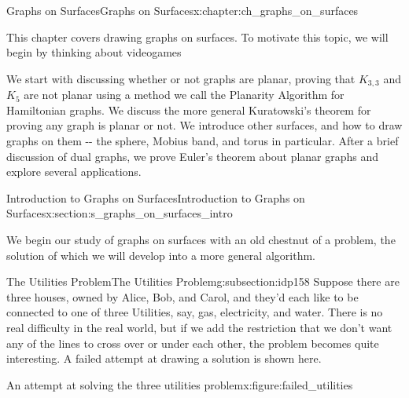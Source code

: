 \documentclass[oneside,10pt,]{book}
\numberwithin{equation}{section}
\begin{document}
\begin{chapterptx}{Graphs on Surfaces}{}{Graphs on Surfaces}{}{}{x:chapter:ch_graphs_on_surfaces}
\begin{introduction}{}%
This chapter covers drawing graphs on surfaces. To motivate this topic, we will begin by thinking about videogames%
\par
We start with discussing whether or not graphs are planar, proving that \(K_{3,3}\) and \(K_5\) are not planar using a method we call the Planarity Algorithm for Hamiltonian graphs.  We discuss the more general Kuratowski's theorem for proving any graph is planar or not.  We introduce other surfaces, and how to draw graphs on them -{}-{} the sphere, Mobius band, and torus in particular.  After a brief discussion of dual graphs, we prove Euler's theorem about planar graphs and explore several applications.%
\end{introduction}%
%
%
\typeout{************************************************}
\typeout{************************************************}
%
\begin{sectionptx}{Introduction to Graphs on Surfaces}{}{Introduction to Graphs on Surfaces}{}{}{x:section:s_graphs_on_surfaces_intro}
\begin{introduction}{}%
We begin our study of graphs on surfaces with an old chestnut of a problem, the solution of which we will develop into a more general algorithm.%
\end{introduction}%
%
%
\typeout{************************************************}
\typeout{************************************************}
%
\begin{subsectionptx}{The Utilities Problem}{}{The Utilities Problem}{}{}{g:subsection:idp158}
Suppose there are three houses, owned by Alice, Bob, and Carol, and they'd each like to be connected to one of three Utilities, say, gas, electricity, and water.  There is no real difficulty in the real world, but if we add the restriction that we don't want any of the lines to cross over or under each other, the problem becomes quite interesting.  A failed attempt at drawing a solution is shown here.%
\begin{figureptx}{An attempt at solving the three utilities problem}{x:figure:failed_utilities}{}%
\begin{image}{0.15}{0.7}{0.15}%

\end{image}
\end{figureptx}
\end{subsectionptx}
\end{sectionptx}
\end{chapterptx}
\end{document}
